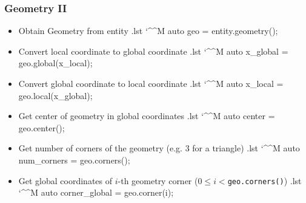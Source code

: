 \documentclass[ignorenonframetext,11pt]{beamer}
\makeatletter
\theoremstyle{definition}
\newenvironment{codeblock}{%
  \begin{tcolorbox}[size=small,oversize,boxrule=0pt,colframe=white]}{%
  \end{tcolorbox}}
\newenvironment{cppcode}{%
  \begingroup
  \@bsphack
  \immediate\openout\lstvrb@out\jobname.lst
  \let\do\@makeother\dospecials\catcode`\^^M\active
  \def\verbatim@processline{%
    \immediate\write\lstvrb@out{\the\verbatim@line}}%
  \verbatim@start}{%
  \immediate\closeout\lstvrb@out
  \@esphack
  \endgroup
  \begin{codeblock}
    
  \end{codeblock}}
\makeatother
\begin{document}
\begin{frame}[fragile]
  \frametitle{Geometry II}
  \begin{itemize}
  \item Obtain Geometry from entity
    \begin{cppcode}
auto geo = entity.geometry();
    \end{cppcode}
  \item Convert local coordinate to global coordinate
    \begin{cppcode}
auto x_global = geo.global(x_local);
    \end{cppcode}
  \item Convert global coordinate to local coordinate
    \begin{cppcode}
auto x_local = geo.local(x_global);
    \end{cppcode}
  \end{itemize}
\end{frame}


\begin{frame}[fragile]
  \begin{itemize}
  \item Get center of geometry in global coordinates
    \begin{cppcode}
auto center = geo.center();
    \end{cppcode}
  \item Get number of corners of the geometry (e.g. 3 for a triangle)
    \begin{cppcode}
auto num_corners = geo.corners();
    \end{cppcode}
  \item Get global coordinates of $i$-th geometry corner ($0 \leq i < $\lstinline!geo.corners()!)
    \begin{cppcode}
auto corner_global = geo.corner(i);
    \end{cppcode}
  \end{itemize}
\end{frame}
\end{document}
